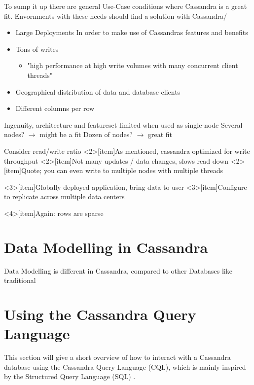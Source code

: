To sump it up there are general Use-Case conditions where Cassandra is a great fit.
Envornments with these needs should find a solution with Cassandra/
\begin{itemize}
    \item Large Deployments
    In order to make use of Cassandras features and benefits 
    \item Tons of writes
      \begin{itemize}
        \item{"high performance at high write volumes with many concurrent client threads" \cite{cassandra_oreilly}}
      \end{itemize}
    \item Geographical distribution of data and database clients
    \item Different columns per row
\end{itemize}
{Ingenuity, architecture and featureset limited when used as single-node}
 {Several nodes? $\rightarrow$ might be a fit}
 {Dozen of nodes? $\rightarrow$ great fit}

{Consider read/write ratio}
    <2>[item]{As mentioned, cassandra optimized for write throughput}
    <2>[item]{Not many updates / data changes, slows read down}
    <2>[item]{Quote; you can even write to multiple nodes with multiple threads}

    <3>[item]{Globally deployed application, bring data to user}
    <3>[item]{Configure to replicate across multiple data centers}

    <4>[item]{Again: rows are sparse}


\section{Data Modelling in Cassandra}  %


 
Data Modelling is different in Cassandra, compared to other Databases like traditional 

\section{Using the Cassandra Query Language}  %
This section will give a short overview of how to interact with a Cassandra database using the Cassandra Query Language (CQL), which is mainly inspired by the Structured Query Language (SQL) \autocite{cqlAlexMeng, newInCQL3, cassandra3cqldocCreateKeystore}.

